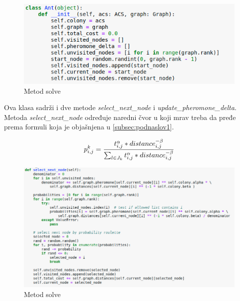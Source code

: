 \documentclass[a4paper]{article}
\begin{document}
{\begin{itemize}
\end{itemize}



\begin{figure}[h!]
\begin{center}
\includegraphics[width=1\columnwidth]{slika5.png}
\end{center}
\caption{Metod solve}
\label{fig:slika5}
\end{figure}

Ova klasa sadrži i dve metode \textit{select\_next\_node} i \textit{update\_pheromone\_delta}.
Metoda \textit{select\_next\_node} određuje naredni čvor u koji mrav treba da pređe prema formuli koja je objašnjena u \ref{subsec:podnaslov1}. 

\begin{equation}\label{1}
p_{i,j}^k = {t_{i,j}^\alpha * distance_{i,j}^{-\beta} \over \sum_{l \in J_k}^{} t_{i,j}^\alpha * distance_{i,j}^{-\beta}}
\end{equation}

\begin{figure}[h!]
\begin{center}
\includegraphics[width=1\columnwidth]{slika6.png}
\end{center}
\caption{Metod solve}
\label{fig:slika5}
\end{figure}

}
\end{document}
